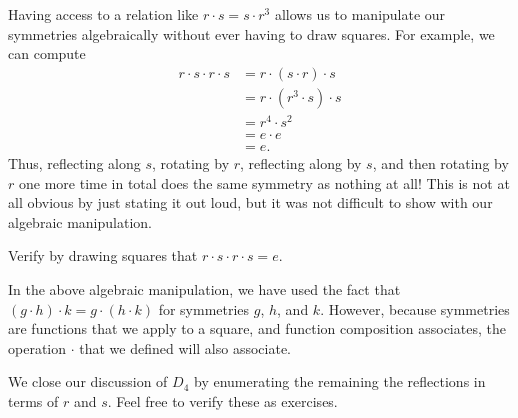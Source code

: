 \documentclass[../notes.tex]{subfiles}
\begin{document}
Having access to a relation like $r\cdot s=s\cdot r^3$ allows us to manipulate our symmetries algebraically without ever having to draw squares. For example, we can compute
\begin{align*}
    r\cdot s\cdot r\cdot s &= r\cdot (s\cdot r)\cdot s \\
    &= r\cdot\left(r^3\cdot s\right)\cdot s \\
    &= r^4\cdot s^2 \\
    &= e\cdot e \\
    &= e.
\end{align*}
Thus, reflecting along $s$, rotating by $r$, reflecting along by $s$, and then rotating by $r$ one more time in total does the same symmetry as nothing at all! This is not at all obvious by just stating it out loud, but it was not difficult to show with our algebraic manipulation.
\begin{exe}
    Verify by drawing squares that $r\cdot s\cdot r\cdot s=e$.
\end{exe}
\begin{remark}
    In the above algebraic manipulation, we have used the fact that $(g\cdot h)\cdot k=g\cdot(h\cdot k)$ for symmetries $g$, $h$, and $k$. However, because symmetries are functions that we apply to a square, and function composition associates, the operation $\cdot$ that we defined will also associate.
\end{remark}
We close our discussion of $D_4$ by enumerating the remaining the reflections in terms of $r$ and $s$. Feel free to verify these as exercises.
\end{document}
